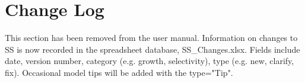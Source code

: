 \section{Change Log}

This section has been removed from the user manual.  Information on changes to SS is now recorded in the spreadsheet database, SS\_Changes.xlsx.  Fields include date, version number, category (e.g. growth, selectivity), type (e.g. new, clarify, fix).  Occasional model tips will be added with the type="Tip".